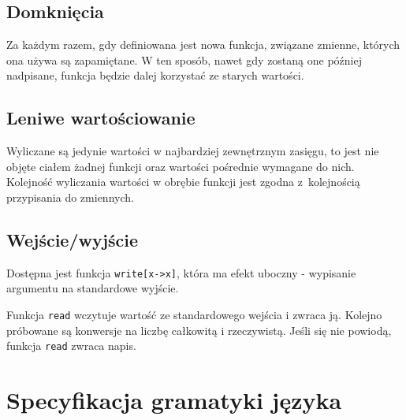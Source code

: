 \documentclass[4paper,10pt]{article}
\begin{document}
\subsection{Domknięcia}
Za każdym razem, gdy definiowana jest nowa funkcja, związane zmienne, których ona używa są zapamiętane.
W ten sposób, nawet gdy zostaną one później nadpisane, funkcja będzie dalej korzystać ze starych wartości.

\subsection{Leniwe wartościowanie}
Wyliczane są jedynie wartości w najbardziej zewnętrznym zasięgu, to jest nie objęte ciałem żadnej funkcji oraz wartości pośrednie wymagane do nich.
Kolejność wyliczania wartości w obrębie funkcji jest zgodna z~kolejnością przypisania do zmiennych.


\subsection{Wejście/wyjście}
Dostępna jest funkcja \texttt{write[x->x]}, która ma efekt uboczny - wypisanie argumentu na standardowe wyjście.

Funkcja \texttt{read} wczytuje wartość ze standardowego wejścia i zwraca ją.
Kolejno próbowane są konwersje na liczbę całkowitą i rzeczywistą.
Jeśli się nie powiodą, funkcja \texttt{read} zwraca napis.

\section{Specyfikacja gramatyki języka}
\end{document}
